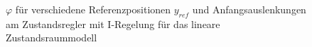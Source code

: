 \documentclass[
	pagesize,
	fontsize=12pt,
	paper=a4,
	oneside,
   reqno
]{scrartcl}
\begin{document}
\begin{figure}[H]
    \centering
    \caption[$\varphi$ für Regler mit I-Regelung (linear)]{$\varphi$ für verschiedene Referenzpositionen $y_{ref}$ und Anfangsauslenkungen am Zustandsregler mit I-Regelung für das lineare Zustandsraummodell}
    \label{fig:Bild18}
\end{figure}
\end{document}

